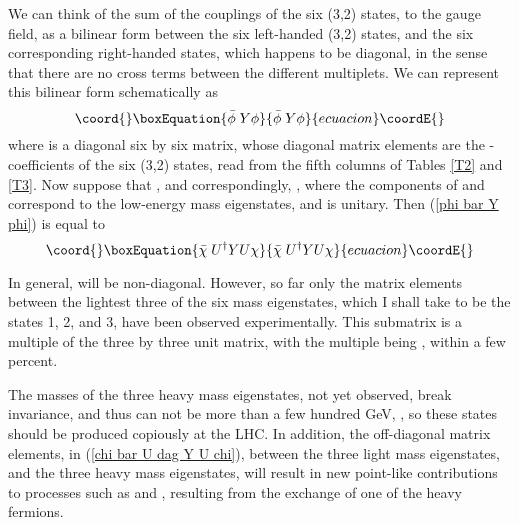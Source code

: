 \documentclass[a4paper,12pt,oneside]{article}
\begin{document}
We can think of the sum of the couplings of the six (3,2) states, 
to the \coordHE{} gauge field, as a bilinear form between 
the six left-handed (3,2) states, and the six corresponding 
right-handed
\coordHE{} states, which happens to be diagonal, in the sense 
that there are no cross terms between the different multiplets.  We
can represent this bilinear form schematically as
\begin{equation}\coord{}\boxEquation{\label{phi bar Y phi}
\bar{\phi}\;Y\phi
}{\bar{\phi}\;Y\phi
}{ecuacion}\coordE{}\end{equation}
where \coordHE{} is a diagonal six by six matrix, whose diagonal matrix
elements are the \coordHE{}-coefficients of the six (3,2) states, read from
the fifth columns of Tables \ref{T2} and \ref{T3}.  Now suppose that
\coordHE{}, and correspondingly, \coordHE{},
where the components of \myHighlight{$\chi$}\coordHE{} and \myHighlight{$\bar{\chi}$}\coordHE{} correspond to the
low-energy mass eigenstates, and \coordHE{} is unitary.  Then
(\ref{phi bar Y phi}) is equal to 
\begin{equation}\coord{}\boxEquation{\label{chi bar U dag Y U chi}
\bar{\chi}\;U^\dag YU\chi
}{\bar{\chi}\;U^\dag YU\chi
}{ecuacion}\coordE{}\end{equation}

In general, \coordHE{} will be non-diagonal.
However, so far only the matrix
elements between the lightest three of the six mass eigenstates,
which I shall take to be the states 1, 2, and 3, have been observed 
experimentally.  This 
submatrix is a multiple of the three by
three unit matrix, with the multiple being \coordHE{},
within a few percent.

The masses of the three heavy mass eigenstates, not yet observed, 
break \coordHE{} invariance, and thus 
can not be more than a few hundred GeV, \cite{Adler}, so these 
states should be produced copiously at the LHC.  In addition, the
off-diagonal matrix elements, in (\ref{chi bar U dag Y U chi}), 
between the three light mass eigenstates, and the three heavy mass
eigenstates, will result in new point-like contributions to 
processes such as \coordHE{} and \coordHE{}, resulting from the exchange of one of the heavy fermions.
\end{document}
